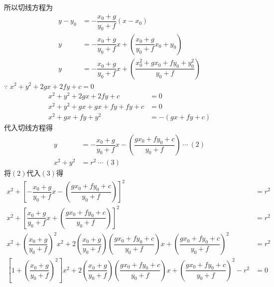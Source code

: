 \documentclass[10pt]{article}
\begin{document}
\begin{enumerate}[leftmargin=*]
\begin{enumerate}
                所以切线方程为
                \begin{align*}
                  y - y_{0} & = -\dfrac{x_{0} + g}{y_{0} + f}(x - x_{0})                                                               \\
                  y         & = -\dfrac{x_{0} + g}{y_{0} + f}x + \left(\dfrac{x_{0} + g}{y_{0} + f}x_{0} + y_{0}\right)                \\
                  y         & = -\dfrac{x_{0} + g}{y_{0} + f}x + \left(\dfrac{x^{2}_{0} + gx_{0} + fy_{0} + y^2_{0}}{y_{0} + f}\right)
                \end{align*}
                $\because$ $x^{2} + y^{2} + 2gx + 2fy + c = 0$
                \begin{align*}
                  x^{2} + y^{2} + 2gx + 2fy + c     & = 0              \\
                  x^2 + y^2 + gx + gx + fy + fy + c & = 0              \\
                  x^2 + gx + fy + y^2               & = -(gx + fy + c)
                \end{align*}
                代入切线方程得
                \begin{align*}
                  y         & = -\dfrac{x_{0} + g}{y_{0} + f}x - \left(\dfrac{gx_{0} + fy_{0} + c}{y_{0} + f}\right)\ \cdots\ (2) \\
                  x^2 + y^2 & = r^2\ \cdots\ (3)
                \end{align*}
                将$(2)$代入$(3)$得
                \begin{align*}
                  x^2 + \left[-\dfrac{x_{0} + g}{y_{0} + f}x - \left(\dfrac{gx_{0} + fy_{0} + c}{y_{0} + f}\right)\right]^2                                                                                                                      & = r^2 \\
                  x^2 + \left[\dfrac{x_{0} + g}{y_{0} + f}x + \left(\dfrac{gx_{0} + fy_{0} + c}{y_{0} + f}\right)\right]^2                                                                                                                       & = r^2 \\
                  x^2 + \left(\dfrac{x_{0} + g}{y_{0} + f}\right)^2x^2 + 2\left(\dfrac{x_{0} + g}{y_{0} + f}\right)\left(\dfrac{gx_{0} + fy_{0} + c}{y_{0} + f}\right)x + \left(\dfrac{gx_{0} + fy_{0} + c}{y_{0} + f}\right)^2                  & = r^2 \\
                  \left[1 + \left(\dfrac{x_{0} + g}{y_{0} + f}\right)^2\right]x^2 + 2\left(\dfrac{x_{0} + g}{y_{0} + f}\right)\left(\dfrac{gx_{0} + fy_{0} + c}{y_{0} + f}\right)x + \left(\dfrac{gx_{0} + fy_{0} + c}{y_{0} + f}\right)^2 - r^2 & = 0   \\

\end{align*}
\end{enumerate}
\end{enumerate}
\end{document}
